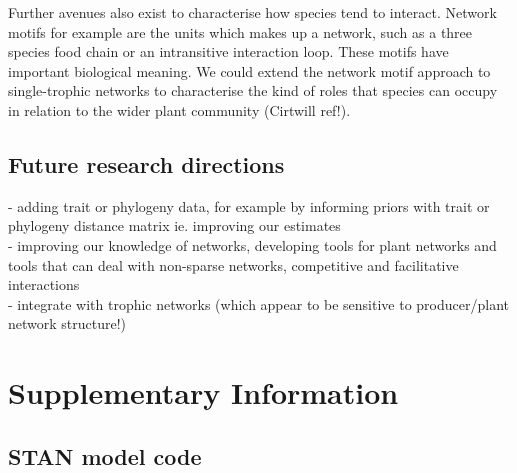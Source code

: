 \documentclass[a4,12pt]{article}
\begin{document}
        Further avenues also exist to characterise how species tend to interact. Network motifs for example are the units which makes up a network, such as a three species food chain or an intransitive interaction loop. These motifs have important biological meaning. We could extend the network motif approach to single-trophic networks to characterise the kind of roles that species can occupy in relation to the wider plant community (Cirtwill ref!). \\



    \subsection{Future research directions}

    
    - adding trait or phylogeny data, for example by informing priors with trait or phylogeny distance matrix
    ie. improving our estimates \\
    - improving our knowledge of networks, developing tools for plant networks and tools that can deal with non-sparse networks, competitive and facilitative interactions \\
    - integrate with trophic networks (which appear to be sensitive to producer/plant network structure!)\\




    

\section{Supplementary Information}

    \subsection{STAN model code}

     
\end{document}

